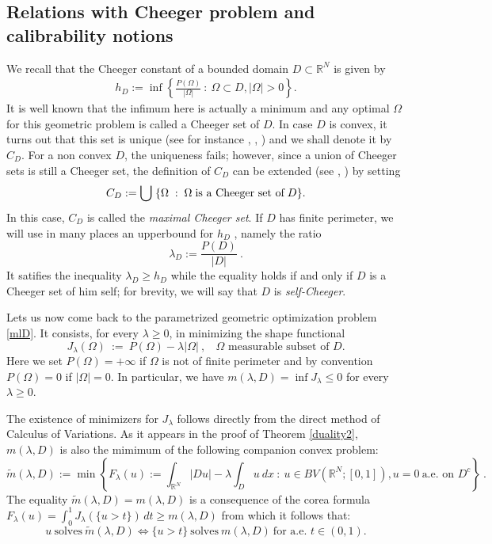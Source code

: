 \documentclass[reqno,11pt]{amsart}
\theoremstyle{definition}
\numberwithin{equation}{section}
\def\R{\mathbb{R}}
\newcommand{\tinm}[1]{\text{\;#1\;}}
\newcommand{\1}{{{\bf 1}\kern-0,28em\rm l}}
\def\sepa{\; : \;}
\def\O{\Omega}
\def\l{\lambda}
\begin{document}
\subsection{Relations with Cheeger problem and calibrability notions}\label{calibrable}

We recall that the Cheeger constant of a bounded domain $D\subset \R^N$ is given by
\begin{align}
h_D:=\inf \left\{  \frac{P(\Omega)}{|\Omega|}\ :\ \Omega\subset D, |\Omega| > 0 \right\} . \label{CheegerConst}
\end{align}
It is well known that the infimum here is actually a minimum and 
any optimal $\Omega$ for  this geometric problem is called a Cheeger set of $D$. In case $D$ is convex, it turns out that this set is unique (see for instance \cite{caselles2007uniqueness}, \cite{leonardi2015overview}, \cite{parini2011introduction}) and we shall denote it by $C_D$. For a non convex $D$, the uniqueness  fails; however, since a union of Cheeger sets is still a Cheeger set, the definition of $C_D$ can be extended 
 (see \cite{leonardi2015overview}, \cite{buttazzo2007selection})  by setting 
\begin{align*}
C_D:=\bigcup \;\{ \Omega \sepa \Omega \tinm{is a Cheeger set of} D\}.
\end{align*}
In this case, $C_D$ is called the \emph{ maximal Cheeger set}.
If $D$ has finite perimeter, we will use in many places an upperbound for $h_D$ , namely the ratio 
\begin{equation} \label{def:lD}
\l_D:= \frac{P(D)}{|D|}\ .
\end{equation}
 It satifies the  inequality $ \l_D \ge h_D$ while the equality holds
 if and only if $D$ is a Cheeger set of him self;  for brevity,  we will say that $D$ is \emph{self-Cheeger}. 
 
 \medskip
 Lets us now  come back to the parametrized geometric optimization problem \eqref{mlD}. It consists, for every $\l\ge 0$, in minimizing the shape functional
 $$ J_\l (\O)\ :=\ P(\O) - \l |\O| \ ,\  \text{ $\O$  measurable subset of $D$}. $$
 Here we set  $P(\O)=+\infty$ if $\O$ is not of finite perimeter and by convention $P(\O)=0$ if $|\O|=0$. In particular, we have 
 $  m(\l,D) = \inf J_\l \le 0$  for every $\l\ge 0$. 
 
 The existence of  minimizers for $J_\l$ follows directly from the direct method of Calculus of Variations. As it appears in the proof of Theorem \ref{duality2}, 
 $m(\l,D)$ is  also the mimimum of the following companion convex problem:
 $$\widetilde m(\l,D) := \min \left\{ F_\l(u):= \int_{\R^N} |Du| - \l \int_D u\ dx  \ :\ u\in BV(\R^N;[0,1]), u=0\ \text{a.e. on\ } D^c\right\} \ .$$
 The equality  $\widetilde m(\l,D)= m(\l,D)$ is a consequence of the corea formula  $ F_\l(u) =\int_0^1 J_\l(\{u>t\})\,dt \ge m(\l,D) $ from which it follows that:
   $$   u \ \text{solves}\  \widetilde m(\l,D) \iff  \{u>t\}\ \text{solves}\  m(\l,D) \ \text{for a.e. $t\in (0,1)$}.$$
  
\end{document}
